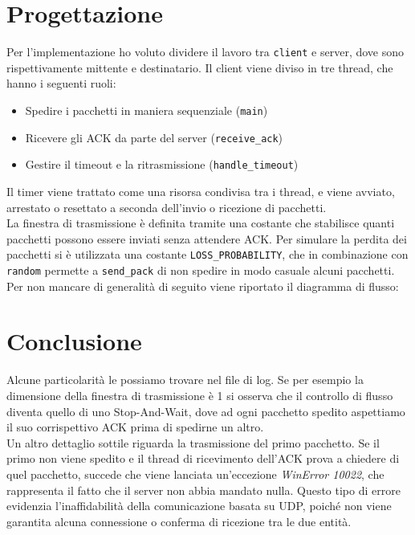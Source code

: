 \documentclass[a4paper,12pt]{report}
\begin{document}
\chapter{Progettazione}
Per l'implementazione ho voluto dividere il lavoro tra \texttt{client} e server,
dove sono rispettivamente mittente e destinatario. Il client viene diviso in tre thread,
che hanno i seguenti ruoli:
\begin{itemize}
  \item Spedire i pacchetti in maniera sequenziale (\texttt{main})
  \item Ricevere gli ACK da parte del server (\texttt{receive\_ack})
  \item Gestire il timeout e la ritrasmissione (\texttt{handle\_timeout})
\end{itemize}
Il timer viene trattato come una risorsa condivisa tra i thread, e viene avviato, arrestato o resettato a seconda dell'invio o ricezione di pacchetti.\\
La finestra di trasmissione è definita tramite una costante che stabilisce quanti pacchetti possono essere inviati senza attendere ACK.
Per simulare la perdita dei pacchetti si è utilizzata una costante
\texttt{LOSS\_PROBABILITY}, che in combinazione con \texttt{random}
permette a \texttt{send\_pack} di non spedire in modo casuale alcuni pacchetti.\\
Per non mancare di generalità di seguito viene riportato il diagramma di flusso:



\chapter{Conclusione}
Alcune particolarità le possiamo trovare nel file di log.
Se per esempio la dimensione della finestra di trasmissione è 1
si osserva che il controllo di flusso diventa quello di
uno Stop-And-Wait, dove ad ogni pacchetto spedito aspettiamo il suo 
corrispettivo ACK prima di spedirne un altro.\\
Un altro dettaglio sottile riguarda la trasmissione del primo pacchetto.
Se il primo non viene spedito e il thread di ricevimento dell'ACK prova
a chiedere di quel pacchetto, succede che viene lanciata un'eccezione
\textit{WinError 10022}, che rappresenta il fatto che il server non abbia mandato nulla.
Questo tipo di errore evidenzia l’inaffidabilità della 
comunicazione basata su UDP, poiché non viene garantita 
alcuna connessione o conferma di ricezione tra le due entità.
\end{document}
